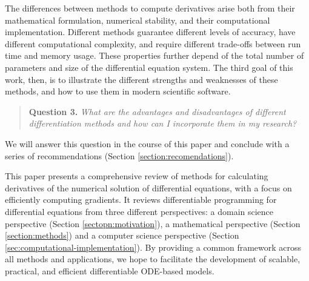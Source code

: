 The differences between methods to compute derivatives arise both from their mathematical formulation, numerical stability, and their computational implementation. 
Different methods guarantee different levels of accuracy, have different computational complexity, and require different trade-offs between run time and memory usage. 
These properties further depend of the total number of parameters and size of the differential equation system. 
The third goal of this work, then, is to illustrate the different strengths and weaknesses of these methods, and how to use them in modern scientific software. 
\begin{quote}
    \textbf{Question 3. }
    \textit{What are the advantages and disadvantages of different differentiation methods and how can I incorporate them in my research?}
\end{quote}
We will answer this question in the course of this paper and conclude with a series of recommendations (Section \ref{section:recomendations}).

This paper presents a comprehensive review of methods for calculating derivatives of the numerical solution of differential equations, with a focus on efficiently computing gradients. 
It reviews differentiable programming for differential equations from three different perspectives: a domain science perspective (Section \ref{sectopn:motivation}), a mathematical perspective (Section \ref{section:methods}) and a computer science perspective (Section \ref{sec:computational-implementation}). 
By providing a common framework across all methods and applications, we hope to facilitate the development of scalable, practical, and efficient differentiable ODE-based models. 


